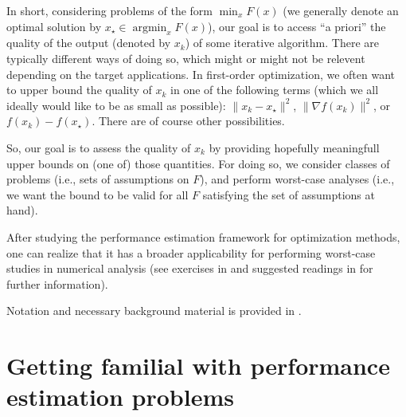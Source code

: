 \documentclass[11pt,a4paper]{article}
\DeclareMathOperator*{\argmin}{argmin}
\begin{document}
	
In short, considering problems of the form $\min_x F(x)$ (we generally denote an optimal solution by $x_\star\in\argmin_x F(x)$), our goal is to access ``a priori'' the quality of the output (denoted by $x_k$) of some iterative algorithm. There are typically different ways of doing so, which might or might not be relevent depending on the target applications. In first-order optimization, we often want to upper bound the quality of $x_k$ in one of the following terms (which we all ideally would like to be as small as possible): $\|x_k-x_\star\|^2$, $\|\nabla f(x_k)\|^2$, or $f(x_k)-f(x_\star)$. There are of course other possibilities.

So, our goal is to assess the quality of $x_k$ by providing hopefully meaningfull upper bounds on (one of) those quantities. For doing so, we consider classes of problems (i.e., sets of assumptions on $F$), and perform worst-case analyses (i.e., we want the bound to be valid for all $F$ satisfying the set of assumptions at hand).
	
After studying the performance estimation framework for optimization methods, one can realize that it has a broader applicability for performing worst-case studies in numerical analysis (see exercises in  and suggested readings in  for further information). 

Notation and necessary background material is provided in .
	

	

	
	\section{Getting familial with performance estimation problems}			%
	
\end{document}
